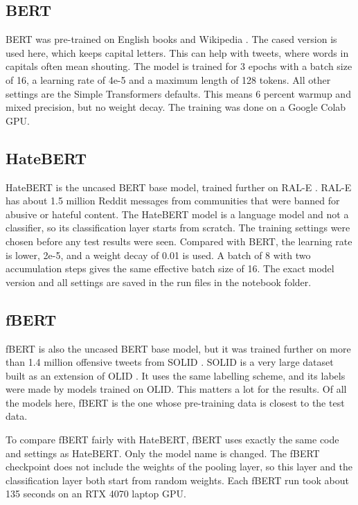\documentclass[11pt,a4paper]{article}
\begin{document}
\subsection{BERT}

BERT was pre-trained on English books and Wikipedia \citep{devlin2019bert}. The cased version is used here, which keeps capital letters. This can help with tweets, where words in capitals often mean shouting. The model is trained for 3 epochs with a batch size of 16, a learning rate of 4e-5 and a maximum length of 128 tokens. All other settings are the Simple Transformers defaults. This means 6 percent warmup and mixed precision, but no weight decay. The training was done on a Google Colab GPU.

\subsection{HateBERT}

HateBERT is the uncased BERT base model, trained further on RAL-E \citep{caselli2021hatebert}. RAL-E has about 1.5 million Reddit messages from communities that were banned for abusive or hateful content. The HateBERT model is a language model and not a classifier, so its classification layer starts from scratch. The training settings were chosen before any test results were seen. Compared with BERT, the learning rate is lower, 2e-5, and a weight decay of 0.01 is used. A batch of 8 with two accumulation steps gives the same effective batch size of 16. The exact model version and all settings are saved in the run files in the notebook folder.

\subsection{fBERT}

fBERT is also the uncased BERT base model, but it was trained further on more than 1.4 million offensive tweets from SOLID \citep{sarkar2021fbert}. SOLID is a very large dataset built as an extension of OLID \citep{rosenthal2021solid}. It uses the same labelling scheme, and its labels were made by models trained on OLID. This matters a lot for the results. Of all the models here, fBERT is the one whose pre-training data is closest to the test data.

To compare fBERT fairly with HateBERT, fBERT uses exactly the same code and settings as HateBERT. Only the model name is changed. The fBERT checkpoint does not include the weights of the pooling layer, so this layer and the classification layer both start from random weights. Each fBERT run took about 135 seconds on an RTX 4070 laptop GPU.
\end{document}
